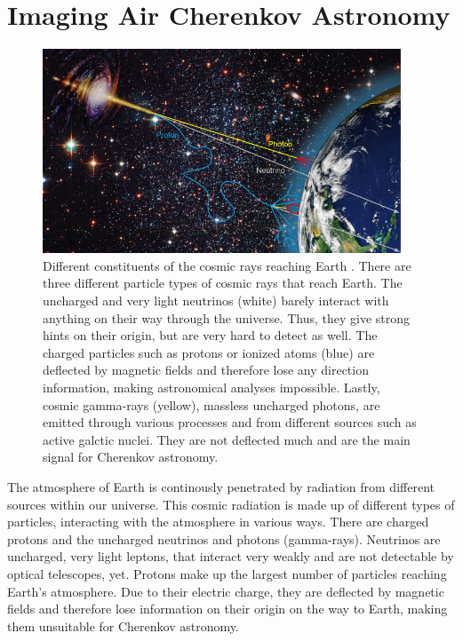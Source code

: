 \chapter{Imaging Air Cherenkov Astronomy}
\label{ch:iact}
%
\begin{figure}[H]
  \centering
  \includegraphics[width=0.95\textwidth]{Plots/cosmic_rays.jpg}
  \caption{Different constituents of the cosmic rays reaching Earth \cite{cosmic-rays}. There are three different particle types of cosmic rays that reach Earth. The uncharged and very light neutrinos (white) barely interact with anything on their way through the universe. Thus, they give strong hints on their origin, but are very hard to detect as well. The charged particles such as protons or ionized atoms (blue) are deflected by magnetic fields and therefore lose any direction information, making astronomical analyses impossible. Lastly, cosmic gamma-rays (yellow), massless uncharged photons, are emitted through various processes and from different sources such as active galctic nuclei. They are not deflected much and are the main signal for Cherenkov astronomy.}
  \label{fig:rays}
\end{figure}
%
The atmosphere of Earth is continously penetrated by radiation from different
sources within our universe. This cosmic radiation is made up of different types
of particles, interacting with the atmosphere in various ways. There are
charged protons and the uncharged neutrinos and photons (gamma-rays). Neutrinos
are uncharged, very light leptons, that interact very weakly and are not
detectable by optical telescopes, yet. Protons make up the largest number of
particles reaching Earth's atmosphere. Due to their electric charge, they are
deflected by magnetic fields and therefore lose information on their origin on
the way to Earth, making them unsuitable for Cherenkov astronomy.
%
